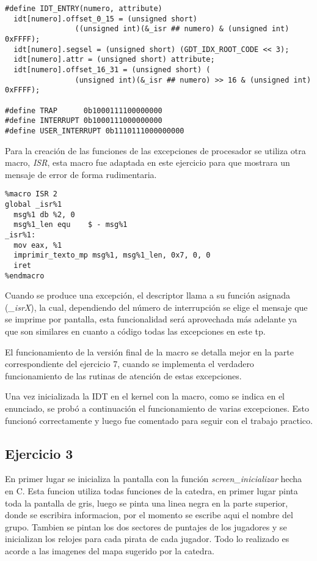 \begin{lstlisting}
#define IDT_ENTRY(numero, attribute)
  idt[numero].offset_0_15 = (unsigned short)
                ((unsigned int)(&_isr ## numero) & (unsigned int) 0xFFFF);
  idt[numero].segsel = (unsigned short) (GDT_IDX_ROOT_CODE << 3);
  idt[numero].attr = (unsigned short) attribute;
  idt[numero].offset_16_31 = (unsigned short) (
                (unsigned int)(&_isr ## numero) >> 16 & (unsigned int) 0xFFFF);

#define TRAP      0b1000111100000000
#define INTERRUPT 0b1000111000000000
#define USER_INTERRUPT 0b1110111000000000
\end{lstlisting}

Para la creación de las funciones de las excepciones de procesador se utiliza
otra macro, {\it ISR\/}, esta macro fue adaptada en este ejercicio para que
mostrara un mensaje de error de forma rudimentaria.

\begin{lstlisting}
%macro ISR 2
global _isr%1
  msg%1 db %2, 0
  msg%1_len equ    $ - msg%1
_isr%1:
  mov eax, %1
  imprimir_texto_mp msg%1, msg%1_len, 0x7, 0, 0
  iret
%endmacro
\end{lstlisting}

Cuando se produce una excepción, el descriptor llama a su función asignada
({\it _isrX\/}), la cual, dependiendo del número de interrupción se elige el
mensaje que se imprime por pantalla, esta funcionalidad será aprovechada más
adelante ya que son similares en cuanto a código todas las excepciones en este
tp.

El funcionamiento de la versión final de la macro se detalla mejor en la parte
correspondiente del ejercicio 7, cuando se implementa el verdadero
funcionamiento de las rutinas de atención
de estas excepciones.

Una vez inicializada la IDT en el kernel con la macro, como se indica en el
enunciado, se probó a continuación el funcionamiento de varias excepciones.
Esto funcionó correctamente y luego fue comentado para seguir con el trabajo
practico.



\subsection{Ejercicio 3}

En primer lugar se inicializa la pantalla con la función {\it screen_inicializar\/} hecha en C.
Esta funcion utiliza todas funciones de la catedra, en primer lugar pinta toda la pantalla de gris, luego
se pinta una linea negra en la parte superior, donde se escribira informacion, por el momento se escribe aqui
el nombre del grupo. Tambien se pintan los dos sectores de puntajes de los jugadores y se inicializan los relojes
para cada pirata de cada jugador. Todo lo realizado es acorde a las imagenes del mapa sugerido por la catedra.

